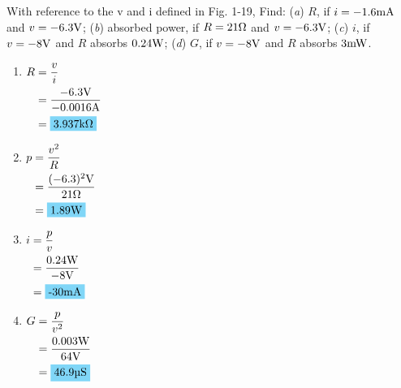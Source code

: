 With reference to the v and i defined in Fig. 1-19, Find: (\emph{a}) $R$, if $i=-1.6\qw{\mA}$ and $v=-6.3\qw{\V}$; (\emph{b}) absorbed power, if $R=21\si{.\ohm}$ and $v=-6.3\qw{\V}$; (\emph{c}) $i$, if $v=-8\qw{\V}$ and $R$ absorbs $0.24\qw{\W}$; (\emph{d}) $G$, if $v=-8\qw{\V}$ and $R$ absorbs $3\qw{\mW}$.

\begin{enumerate}[leftmargin=2cm,labelsep=.5cm,label=\bfseries\alph*)]
	\item $
	\begin{aligned}[t]
	R &= \frac{v}{i} \\
	  &= \frac{-6.3\qw{\V}}{-0.0016\qw{\A}} \\
	  &= \hlbox{3.937\qw{\kohm}}
	\end{aligned} $
	\\[1cm]
	
	\item $
	\begin{aligned}[t]
	p &= \frac{v^2}{R} \\
	&= \frac{(-6.3)^2\qw{\V}}{21\qw{\ohm}} \\
	&= \hlbox{1.89\qw{\W}}
	\end{aligned} $
	\\[1cm]
	
	\item $
	\begin{aligned}[t]
	i &= \frac{p}{v} \\
	&= \frac{0.24\qw{\W}}{-8\qw{\V}} \\
	&= \hlbox{-30\qw{\mA}}
	\end{aligned} $
	\\[1cm]
	
	\item $
	\begin{aligned}[t]
	G &= \frac{p}{v^2} \\
	&= \frac{0.003\qw{\W}}{64\qw{\V}} \\
	&= \hlbox{46.9\qw{\micro\siemens}}
	\end{aligned} $
	\\[1cm]
\end{enumerate}